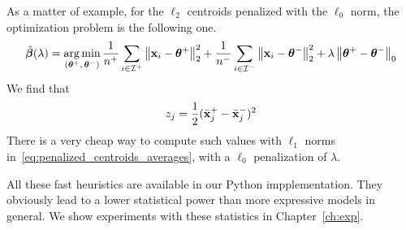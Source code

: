 As a matter of example, for the $\ell_2$ centroids penalized with the $\ell_0$ norm,
the optimization problem is the following one.
\begin{equation}\label{eq:penalized_centroids_averages}
    \hat{\bm{\beta}}(\lambda) = \operatorname*{arg\,min}_{( \bm{\theta}^+,\, \bm{\theta}^-)}
        \frac{1}{n^+} \sum_{i \in \mathcal{I}^+} \big\lVert \mathbf{x}_i - \bm{\theta}^+ \big\rVert^2_2
        + \frac{1}{n^-} \sum_{i \in \mathcal{I}^-} \big\lVert \mathbf{x}_i - \bm{\theta}^- \big\rVert^2_2
        + \lambda \left\lVert\bm{\theta}^+ - \bm{\theta}^-\right\rVert_0
\end{equation}
We find that
\begin{align*}
    z_j = \frac{1}{2}(\bar{\mathbf{x}}^+_j - \bar{\mathbf{x}}^-_j)^2
\end{align*}
There is a very cheap way to compute such values with $\ell_1$ norms in~\ref{eq:penalized_centroids_averages},
with a $\ell_0$ penalization of $\lambda$.

\bigbreak
All these fast heuristics are available in our Python impplementation.
They obviously lead to a lower statistical power than more expressive models in general.
We show experiments with these statistics in Chapter~\ref{ch:exp}.
